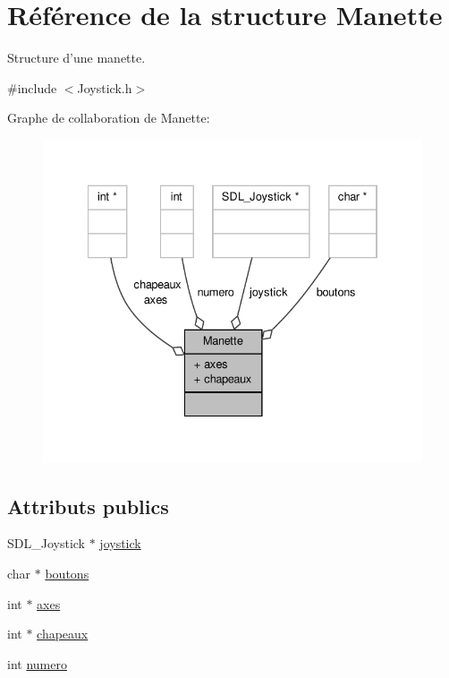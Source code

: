 \hypertarget{structManette}{\section{Référence de la structure Manette}
\label{structManette}
}


Structure d'une manette.  




{\ttfamily \#include $<$Joystick.\-h$>$}



Graphe de collaboration de Manette\-:
\nopagebreak
\begin{figure}[H]
\begin{center}
\leavevmode
\includegraphics[width=334pt]{structManette__coll__graph}
\end{center}
\end{figure}
\subsection*{Attributs publics}
\begin{DoxyCompactItemize}
\item 
S\-D\-L\-\_\-\-Joystick $\ast$ \hyperlink{structManette_ad11c45cf2d1afa059fae52ab61a177d8}{joystick}
\item 
char $\ast$ \hyperlink{structManette_a07814b5f1ebd865b6e15d2094cf5d671}{boutons}
\item 
int $\ast$ \hyperlink{structManette_abc9f5234f07d79af9735b501956a8d60}{axes}
\item 
int $\ast$ \hyperlink{structManette_ab12d322b8fadc5e42218b065e7f86d65}{chapeaux}
\item 
int \hyperlink{structManette_aedc72637b122d8d34ce23f4cf98be10b}{numero}
\end{DoxyCompactItemize}


